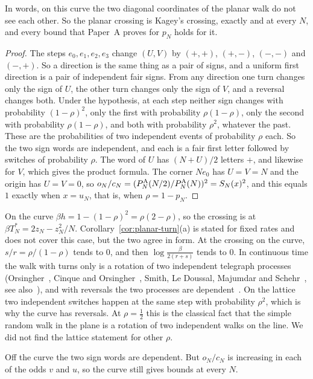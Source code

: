 In words, on this curve the two diagonal coordinates of the planar walk do not see each other. So
the planar crossing is Kagey's crossing, exactly and at every $N$, and every bound that Paper~A
proves for $p_N$ holds for it.

\begin{proof}
The steps $e_0,e_1,e_2,e_3$ change $(U,V)$ by $(+,+)$, $(+,-)$, $(-,-)$ and $(-,+)$. So a
direction is the same thing as a pair of signs, and a uniform first direction is a pair of
independent fair signs. From any direction one turn changes only the sign of $U$, the other turn
changes only the sign of $V$, and a reversal changes both. Under the hypothesis, at each step
neither sign changes with probability $(1-\rho)^2$, only the first with probability
$\rho(1-\rho)$, only the second with probability $\rho(1-\rho)$, and both with probability
$\rho^2$, whatever the past. These are the probabilities of two independent events of probability
$\rho$ each. So the two sign words are independent, and each is a fair first letter followed by
switches of probability $\rho$. The word of $U$ has $(N+U)/2$ letters $+$, and likewise for $V$,
which gives the product formula. The corner $Ne_0$ has $U=V=N$ and the origin has $U=V=0$, so
$o_N/c_N=(P^{\rm A}_N(N/2)/P^{\rm A}_N(N))^2=S_N(x)^2$, and this equals $1$ exactly when $x=u_N$,
that is, when $\rho=1-p_N$.
\end{proof}

On the curve $\beta h=1-(1-\rho)^2=\rho(2-\rho)$, so the crossing is at
$\beta T^*_N=2z_N-z_N^2/N$. Corollary~\ref{cor:planar-turn}(a) is stated for fixed rates and does
not cover this case, but the two agree in form. At the crossing on the curve, $s/r=\rho/(1-\rho)$
tends to $0$, and then $\log\frac\beta{2(r+s)}$ tends to $0$. In continuous time the walk with turns only is a rotation of two independent telegraph processes
(Orsingher~\cite{orsingher2000}, Cinque and Orsingher~\cite[Theorem~2.2]{cinqueorsingher2023}, Smith, Le
Doussal, Majumdar and Schehr~\cite{sldms2022}, see also~\cite[Eq.~(36)]{angelani2022}), and with
reversals the two processes are dependent~\cite[Section~3]{cinqueorsingher2023}. On the lattice two
independent switches happen at the same step with probability $\rho^2$, which is why the curve has
reversals. At $\rho=\frac12$ this is the classical fact that the simple random walk in the plane is
a rotation of two independent walks on the line. We did not find the lattice statement for other
$\rho$.

Off the curve the two sign words are dependent. But $o_N/c_N$ is increasing in each of the odds $v$
and $u$, so the curve still gives bounds at every $N$.

